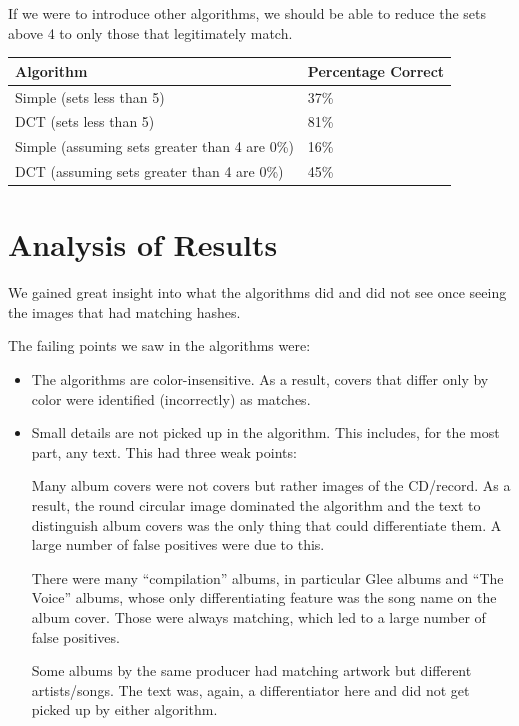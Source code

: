 \documentclass[11pt,a4paper,titlepage]{article}
\begin{document}
If we were to introduce other algorithms, we should be able to reduce the sets
above 4 to only those that legitimately match.

\begin{minipage}{\linewidth}
\centering
\begin{tabular}{|l|l|}
\hline
Algorithm                           & Percentage Correct \\ \hline
Simple (sets less than 5)                   & 37\%  \\ \hline
DCT (sets less than 5)                      & 81\%  \\ \hline
Simple (assuming sets greater than 4 are 0\%)  & 16\%  \\ \hline
DCT (assuming sets greater than 4 are 0\%)     & 45\%  \\ \hline
\end{tabular}
\end{minipage}

\section{Analysis of Results}

We gained great insight into what the algorithms did and did not see once
seeing the images that had matching hashes.

The failing points we saw in the algorithms were:

\begin{itemize}
    \item
        The algorithms are color-insensitive.  As a result, covers that differ
        only by color were identified (incorrectly) as matches.

    \item
        Small details are not picked up in the algorithm.  This includes, for
        the most part, any text.  This had three weak points:

        Many album covers were not covers but rather images of the
        CD/record.  As a result, the round circular image dominated the
        algorithm and the text to distinguish album covers was the only
        thing that could differentiate them.  A large number of false
        positives were due to this.

        There were many ``compilation'' albums, in particular Glee
        albums and ``The Voice'' albums, whose only differentiating
        feature was the song name on the album cover.  Those were
        always matching, which led to a large number of false
        positives.

        Some albums by the same producer had matching artwork but
        different artists/songs.  The text was, again, a differentiator
        here and did not get picked up by either algorithm.
\end{itemize}
\end{document}
